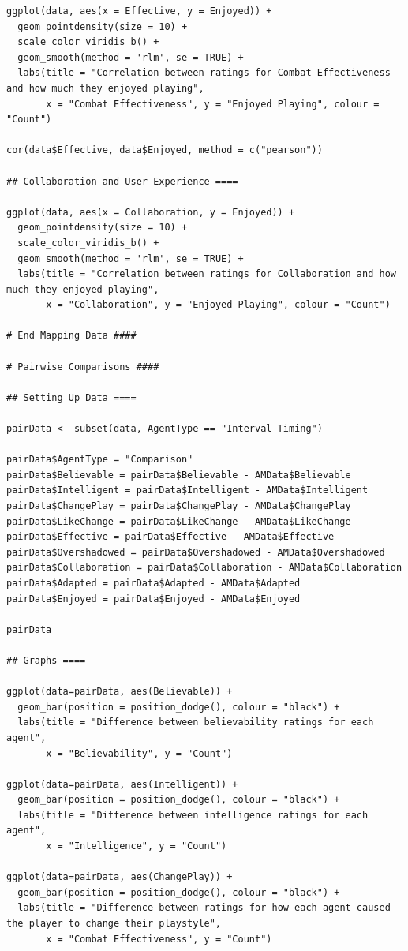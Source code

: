 \documentclass{IEEEtran}
\begin{document}
\begin{verbatim}
ggplot(data, aes(x = Effective, y = Enjoyed)) +
  geom_pointdensity(size = 10) +
  scale_color_viridis_b() + 
  geom_smooth(method = 'rlm', se = TRUE) +
  labs(title = "Correlation between ratings for Combat Effectiveness and how much they enjoyed playing",
       x = "Combat Effectiveness", y = "Enjoyed Playing", colour = "Count")

cor(data$Effective, data$Enjoyed, method = c("pearson"))

## Collaboration and User Experience ====

ggplot(data, aes(x = Collaboration, y = Enjoyed)) +
  geom_pointdensity(size = 10) +
  scale_color_viridis_b() + 
  geom_smooth(method = 'rlm', se = TRUE) +
  labs(title = "Correlation between ratings for Collaboration and how much they enjoyed playing",
       x = "Collaboration", y = "Enjoyed Playing", colour = "Count")

# End Mapping Data ####

# Pairwise Comparisons ####

## Setting Up Data ====

pairData <- subset(data, AgentType == "Interval Timing")

pairData$AgentType = "Comparison"
pairData$Believable = pairData$Believable - AMData$Believable
pairData$Intelligent = pairData$Intelligent - AMData$Intelligent
pairData$ChangePlay = pairData$ChangePlay - AMData$ChangePlay
pairData$LikeChange = pairData$LikeChange - AMData$LikeChange
pairData$Effective = pairData$Effective - AMData$Effective
pairData$Overshadowed = pairData$Overshadowed - AMData$Overshadowed
pairData$Collaboration = pairData$Collaboration - AMData$Collaboration
pairData$Adapted = pairData$Adapted - AMData$Adapted
pairData$Enjoyed = pairData$Enjoyed - AMData$Enjoyed

pairData

## Graphs ====

ggplot(data=pairData, aes(Believable)) +
  geom_bar(position = position_dodge(), colour = "black") +
  labs(title = "Difference between believability ratings for each agent",
       x = "Believability", y = "Count")

ggplot(data=pairData, aes(Intelligent)) +
  geom_bar(position = position_dodge(), colour = "black") +
  labs(title = "Difference between intelligence ratings for each agent",
       x = "Intelligence", y = "Count")

ggplot(data=pairData, aes(ChangePlay)) +
  geom_bar(position = position_dodge(), colour = "black") +
  labs(title = "Difference between ratings for how each agent caused the player to change their playstyle",
       x = "Combat Effectiveness", y = "Count")


\end{verbatim}
\end{document}
